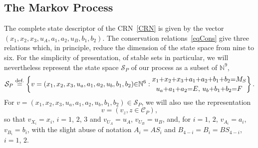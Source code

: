 \documentclass[english]{amsart}
\newcommand{\N}{\ensuremath{\mathbb{N}}}
\newcommand{\cal}[1]{\ensuremath{\mathcal{#1}}}
\newcommand\steq[1]{\stackrel{\text{\rm #1.}}{=}}
\numberwithin{proposition}{section}
\begin{document}
\subsection{The Markov Process}
The complete state descriptor of the CRN~\eqref{CRN} is given by the vector $(x_1,x_2,x_3,u_A,a_1,a_2,u_B,b_1,b_2)$. The conservation relations~\eqref{eqCons} give three relations which, in principle,  reduce the dimension of the state space from nine to six. For the simplicity of presentation, of stable sets in particular, we will nevertheless represent the state space ${\cal S}_P$ of our process as a subset of $\N^9$, 
\[
{\cal S}_P\steq{def} \left\{v=(x_1,x_2,x_3,u_a,a_1,a_2,u_b,b_1,b_2){\in}\N^6: \substack{\displaystyle x_1{+}x_2{+}x_3{+}a_1{+}a_2{+}b_1{+}b_2{=}M_S\\\ \\\displaystyle u_a{+}a_1{+}a_2{=} E,\, u_b{+}b_1{+}b_2{=}F}\right\}.
\]
For $v{=}(x_1,x_2,x_3,u_a,a_1,a_2,u_b,b_1,b_2){\in}{\cal S}_P$, we will also use  the representation
\[
v=(v_{z}, z{\in}{\cal C}_P),
\]
so that $v_{X_i}{=}x_i$, $i{=}1$, $2$, $3$ and $v_{U_A}{=}u_A$, $v_{U_B}{=}u_B$, and, for $i{=}1$, $2$, $v_{A_i}{=}a_i$, $v_{B_{i}}{=}b_{i}$, with the slight abuse of notation ${A_i}{=}{AS_i}$ and $B_{4-i}{=}B_{i}{=}BS_{4-i}$, $i{=}1$, $2$.
\end{document}

